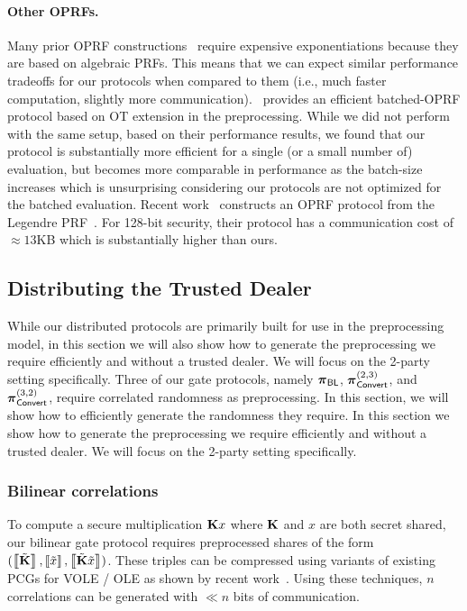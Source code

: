 \paragraph{Other OPRFs.}
Many prior OPRF constructions~\cite{freedman2005-oprf,jarecki2009-oprf} require expensive exponentiations because they are based on algebraic PRFs. This means that we can expect similar performance tradeoffs for our protocols when compared to them (i.e., much faster computation, slightly more communication).~\cite{kolesnikov2016-oprf} provides an efficient batched-OPRF protocol based on OT extension in the preprocessing. While we did not perform with the same setup, based on their performance results, we found that our protocol is substantially more efficient for a single (or a small number of) evaluation, but becomes more comparable in performance as the batch-size increases which is unsurprising considering our protocols are not optimized for the batched evaluation. Recent work~\cite{seres2021-legendre} constructs an OPRF protocol from the Legendre PRF~\cite{damgard1988-legendre}. For 128-bit security, their protocol has a communication cost of $\approx 13$KB which is substantially higher than ours.

\fi

\subsection{Distributing the Trusted Dealer}
\label{subsec:preprocessing}
\iffull
While our distributed protocols are primarily built for use in the preprocessing model, in this section we will also show how to generate the preprocessing we require efficiently and without a trusted dealer. We will focus on the 2-party setting specifically. Three of our gate protocols, namely $\boldsymbol{\pi}_{\textnormal{\textsf{BL}}}$, $\boldsymbol{\pi}_{\textnormal{\textsf{Convert}}}^{(2,3)}$, and $\boldsymbol{\pi}_{\textnormal{\textsf{Convert}}}^{(3,2)}$, require correlated randomness as preprocessing. In this section, we will show how to efficiently generate the randomness they require.
\else
In this section we show how to generate the preprocessing we require efficiently and without a trusted dealer. We will focus on the 2-party setting specifically.
\fi

\iffull
\subsubsection{Bilinear correlations}
To compute a secure multiplication $\mat{K}x$ where $\mat{K}$ and $x$ are both secret shared, our bilinear gate protocol requires preprocessed shares of the form $(\share{\tilde{\mat{K}}}, \share{\tilde{x}}, \share{\tilde{\mat{K}}\tilde{x}})$. These triples can be compressed using variants of existing PCGs for VOLE / OLE as shown by recent work~\cite{boyle2019-pcg, boyle2020-lpn-pcg}. Using these techniques, $n$ correlations can be generated with $\ll n$ bits of communication.
\fi

